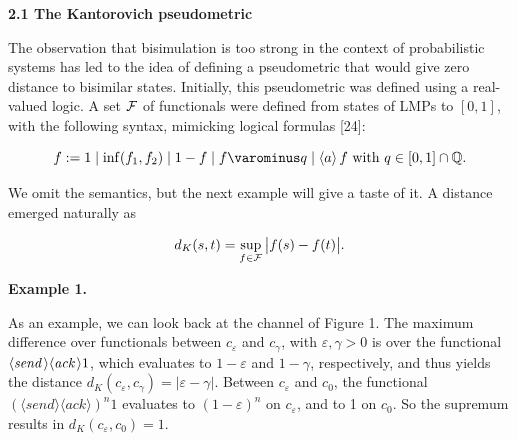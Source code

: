 \documentclass[10pt,a4paper]{article}
\begin{document}
 
 
\par\medskip\noindent\textbf{2.1 The Kantorovich pseudometric}\par
 
 
The observation that bisimulation is too strong in the context of probabilistic systems has led to the idea of defining a pseudometric that would give zero distance to bisimilar states. Initially, this pseudometric was defined using a real-valued logic. A set $\cal F$ of functionals were defined from states of LMPs to $[0,1]$, with the following syntax, mimicking logical formulas [24]:\par
  
\par  \quad  \[f:=1\mid\inf(f_{1},f_{2})\mid 1-f\mid f\varominus q\mid\langle a\rangle\,f\mbox{ with }q\in[0,1]\cap\mathbb{Q}.\]\quad  \quad  
  
We omit the semantics, but the next example will give a taste of it. A distance emerged naturally as\par
  
\par  \quad  \[d_{K}(s,t)=\sup_{f\in\cal F}\big|f(s)-f(t)\big|.\]\quad  \quad  
  
 
 
\par\medskip\noindent\textbf{Example 1.}\par
 
 
As an example, we can look back at the channel of Figure 1. The maximum difference over functionals between $c_{\varepsilon}$ and $c_{\gamma}$, with $\varepsilon,\gamma>0$ is over the functional $\langle\textit{send\,}\rangle\langle\textit{ack}\,\rangle 1$, which evaluates to $1-\varepsilon$ and $1-\gamma$, respectively, and thus yields the distance $d_{K}(c_{\varepsilon},c_{\gamma})=|\varepsilon-\gamma|$. Between $c_{\varepsilon}$ and $c_{0}$, the functional $(\langle send\rangle\langle ack\rangle)^{n}1$ evaluates to $(1-\varepsilon)^{n}$ on $c_{\varepsilon}$, and to 1 on $c_{0}$. So the supremum results in $d_{K}(c_{\varepsilon},c_{0})=1$.\par
 
 
 
\end{document}
